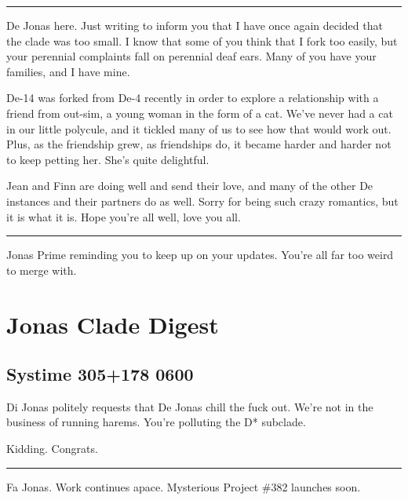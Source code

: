 \begin{center}\rule{0.5\linewidth}{\linethickness}\end{center}

De Jonas here. Just writing to inform you that I have once again decided that the clade was too small. I know that some of you think that I fork too easily, but your perennial complaints fall on perennial deaf ears. Many of you have your families, and I have mine.

De-14 was forked from De-4 recently in order to explore a relationship with a friend from out-sim, a young woman in the form of a cat. We've never had a cat in our little polycule, and it tickled many of us to see how that would work out. Plus, as the friendship grew, as friendships do, it became harder and harder not to keep petting her. She's quite delightful.

Jean and Finn are doing well and send their love, and many of the other De instances and their partners do as well. Sorry for being such crazy romantics, but it is what it is. Hope you're all well, love you all.

\begin{center}\rule{0.5\linewidth}{\linethickness}\end{center}

Jonas Prime reminding you to keep up on your updates. You're all far too weird to merge with.

\newpage
\hypertarget{jonas-clade-digest-1}{%
\section*{Jonas Clade Digest}\label{jonas-clade-digest-1}}

\hypertarget{systime-305178-0600}{%
\subsection*{Systime 305+178 0600}\label{systime-305178-0600}}

Di Jonas politely requests that De Jonas chill the fuck out. We're not in the business of running harems. You're polluting the D* subclade.

Kidding. Congrats.

\begin{center}\rule{0.5\linewidth}{\linethickness}\end{center}

Fa Jonas. Work continues apace. Mysterious Project \#382 launches soon.

